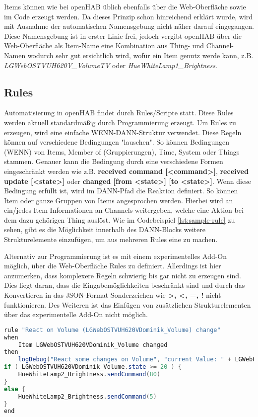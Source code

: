 Items können wie bei openHAB üblich ebenfalls über die Web-Oberfläche sowie im Code erzeugt werden. Da dieses Prinzip schon hinreichend erklärt wurde, wird mit Ausnahme der automatischen Namensgebung nicht näher darauf eingegangen. Diese Namensgebung ist in erster Linie frei, jedoch vergibt openHAB über die Web-Oberfläche als Item-Name eine Kombination aus Thing- und Channel-Namen wodurch sehr gut ersichtlich wird, wofür ein Item genutz werde kann, z.B. \textit{LGWebOSTVUH620V\_VolumeTV} oder \textit{HueWhiteLamp1\_Brightness}.

\subsection{Rules}
Automatisierung in openHAB findet durch Rules/Scripte statt. Diese Rules werden aktuell standardmäßig durch Programmierung erzeugt. Um Rules zu erzeugen, wird eine einfache WENN-DANN-Struktur verwendet. Diese Regeln können auf verschiedene Bedingungen "lauschen". So können Bedingungen (WENN) von Items, Member of (Gruppierungen), Time, System oder Things stammen. Genauer kann die Bedingung durch eine verschiedene Formen eingeschränkt werden wie z.B. \textbf{received command [<command>]},  \textbf{received update [<state>]} oder \textbf{changed [from <state>] [to <state>]}.
Wenn diese Bedingung erfüllt ist, wird im DANN-Pfad die Reaktion definiert. So können Item oder ganze Gruppen von Items angesprochen werden. Hierbei wird an ein/jedes Item Informationen an Channels weitergeben, welche eine Aktion bei dem dazu gehörigen Thing auslöst.
Wie im Codebeispiel \ref{lst:sample-rule} zu sehen, gibt es die Möglichkeit innerhalb des DANN-Blocks weitere Strukturelemente einzufügen, um aus mehreren Rules eine zu machen.

Alternativ zur Programmierung ist es mit einem experimentelles Add-On möglich, über die Web-Oberfläche Rules zu definiert. Allerdings ist hier anzumerken, dass komplexere Regeln schwierig bis gar nicht zu erzeugen sind. Dies liegt daran, dass die Eingabemöglichkeiten beschränkt sind und durch das Konvertieren in das JSON-Format Sonderzeichen wie \textbf{>, <, =, !} nicht funktionieren. Des Weiteren ist das Einfügen von zusätzlichen Strukturelementen über das experimentelle Add-On nicht möglich.


\begin{lstlisting}[language=java,firstnumber=1,caption=Rule Beispiel,label=lst:sample-rule]
rule "React on Volume (LGWebOSTVUH620VDominik_Volume) change"
when
	Item LGWebOSTVUH620VDominik_Volume changed
then
	logDebug("React some changes on Volume", "current Value: " + LGWebOSTVUH620VDominik_Volume.state.toString)
if ( LGWebOSTVUH620VDominik_Volume.state >= 20 ) {
	HueWhiteLamp2_Brightness.sendCommand(80)
}
else {
	HueWhiteLamp2_Brightness.sendCommand(5)
}
end
\end{lstlisting}

